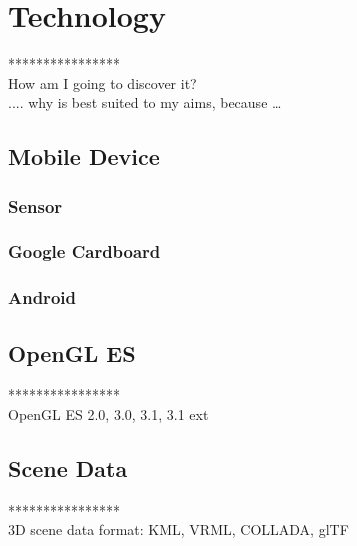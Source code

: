 \label{chapter-technology}
\chapter{Technology}

****************\\
How am I going to discover it?\\
.... why is best suited to my aims, because …\\

\section{Mobile Device}

\subsection{Sensor}

\subsection{Google Cardboard}

\subsection{Android}

\section{OpenGL ES}

****************\\
OpenGL ES 2.0, 3.0,  3.1, 3.1 ext\\

\section{Scene Data}

****************\\
3D scene data format: KML, VRML, COLLADA,  glTF\\

